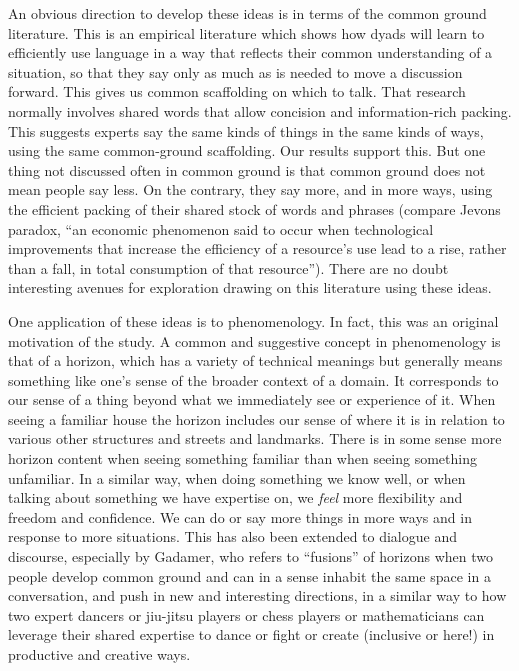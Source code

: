 \documentclass{article}
\begin{document}
An obvious direction to develop these ideas is in terms of the common ground literature. This is an empirical literature which shows how dyads will learn to efficiently use language in a way that reflects their common understanding of a situation, so that they say only as much as is needed to move a discussion forward.  This gives us common scaffolding on which to talk. That research normally involves shared words that allow concision and information-rich packing. This suggests experts say the same kinds of things in the same kinds of ways, using the same common-ground scaffolding. Our results support this. But one thing not discussed often in common ground is that common ground does not mean people say less. On the contrary, they say more, and in more ways, using the efficient packing of their shared stock of words and phrases (compare Jevons paradox, ``an economic phenomenon said to occur when technological improvements that increase the efficiency of a resource's use lead to a rise, rather than a fall, in total consumption of that resource''). %
There are no doubt interesting avenues for exploration drawing on this literature using these ideas.

One application of these ideas is to phenomenology. In fact, this was an original motivation of the study. A common and suggestive concept in phenomenology is that of a horizon, which has a variety of technical meanings but generally means something like one's sense of the broader context of a domain. It corresponds to our sense of a thing beyond what we immediately see or experience of it. When seeing a familiar house the horizon includes our sense of where it is in relation to various other structures and streets and landmarks. There is in some sense more horizon content when seeing something familiar than when seeing something unfamiliar. In a similar way, when doing something we know well, or when talking about something we have expertise on, we \emph{feel} more flexibility and freedom and confidence. We can do or say more things in more ways and in response to more situations. This has also been extended to dialogue and discourse, especially by Gadamer, who refers to ``fusions'' of horizons when two people develop common ground and can in a sense inhabit the same space in a conversation, and push in new and interesting directions, in a similar way to how two expert dancers or jiu-jitsu players or chess players or mathematicians can leverage their shared expertise to dance or fight or create (inclusive or here!) in productive and creative ways.  
\end{document}
